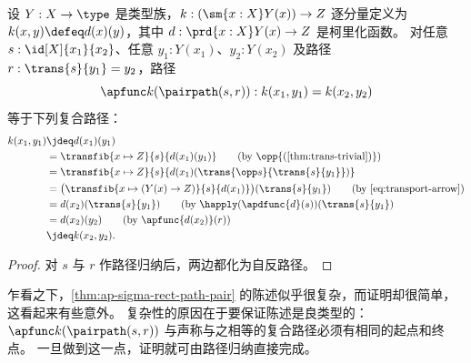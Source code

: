 \begin{lem}\label{thm:ap-sigma-rect-path-pair}
  设 $Y:X\to\type$ 是类型族，$k:(\sm{x:X}Y(x)) \to Z$ 逐分量定义为 $k(x,y) \defeq d(x)(y)$，其中 $d:\prd{x:X} Y(x)\to Z$ 是柯里化函数。
  对任意 $s:\id[X]{x_1}{x_2}$、任意 $y_1:Y(x_1)$、$y_2:Y(x_2)$ 及路径 $r:\trans{s}{y_1}=y_2$，路径
  \[\apfunc k (\pairpath(s,r)) :k(x_1,y_1) = k(x_2,y_2)\]
  等于下列复合路径：
  \begin{align}
    k(x_1,y_1)
    &\jdeq d(x_1)(y_1) \notag\\
    &= \transfib{x\mapsto Z}{s}{d(x_1)(y_1)}
    \tag{by $\opp{\text{(\cref{thm:trans-trivial})}}$}\\
    &= \transfib{x\mapsto Z}{s}{d(x_1)(\trans{\opp s}{\trans{s}{y_1}})}
    \notag\\
    &= \big(\transfib{x\mapsto (Y(x)\to Z)}{s}{d(x_1)}\big)(\trans{s}{y_1})
    \tag{by~\eqref{eq:transport-arrow}}\\
    &= d(x_2)(\trans{s}{y_1})
    \tag{by $\happly(\apdfunc{d}(s))(\trans{s}{y_1}$}\\
    &= d(x_2)(y_2)
    \tag{by $\apfunc{d(x_2)}(r)$}\\
    &\jdeq k(x_2,y_2).
    \notag
  \end{align}
\end{lem}
\begin{proof}
  对 $s$ 与 $r$ 作路径归纳后，两边都化为自反路径。
\end{proof}

乍看之下，\cref{thm:ap-sigma-rect-path-pair} 的陈述似乎很复杂，而证明却很简单，这看起来有些意外。
复杂性的原因在于要保证陈述是良类型的：$\apfunc k (\pairpath(s,r))$ 与声称与之相等的复合路径必须有相同的起点和终点。
一旦做到这一点，证明就可由路径归纳直接完成。

